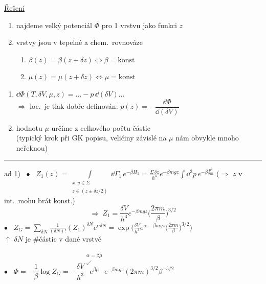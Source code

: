{\color{NavyBlue}
\underline{Řešení}

\begin{minipage}{0.48\textwidth}
\begin{enumerate}[label=\arabic*)]
  \item najdeme velký potenciál $\Phi$ pro 1 vrstvu jako funkci $z$
  \item vrstvy jsou v tepelné a chem.\ rovnováze
  \begin{enumerate}[label=\roman*)]
    \item $\beta(z) = \beta(z + \delta z) \Leftrightarrow \beta = \text{konst}$
    \item $\mu(z) = \mu(z + \delta z) \Leftrightarrow \mu = \text{konst}$
  \end{enumerate}
\end{enumerate}
\end{minipage}
\begin{minipage}{0.5\textwidth}
\end{minipage}

\begin{enumerate}[label=\arabic*),start=3]
  \item $\dd\Phi(T,\delta V,\mu,z) = \dots - p\,\dd(\delta V)\dots$ \\
        $\Rightarrow$ loc.\ je tlak dobře definován: \quad $p(z) = -\dfrac{\dd\Phi}{\dd(\delta V)}$
  \item hodnotu $\mu$ určíme z celkového počtu částic \\
        (typický krok při GK popisu, veličiny závislé na $\mu$ nám obvykle mnoho neřeknou)
\end{enumerate}

\noindent\rule{0.6\linewidth}{0.4pt}

ad 1) \ $\bullet$ \
$Z_1(z) = \displaystyle\int\limits_{\substack{x,y\in\Sigma\\ z\in(z\pm\delta z/2)}}\dd\Gamma_1\,e^{-\beta H_1}
 = \frac{\Sigma\,\delta z}{h^3}e^{-\beta mgz}\int\dd^3p\,e^{-\beta\frac{p^2}{2m}}$
\quad \small($\Rightarrow$ $z$ v int.\ mohu brát konst.)\normalsize
\[
  \Rightarrow\ Z_1 = \frac{\delta V}{h^3}e^{-\beta mgz}\Big(\frac{2\pi m}{\beta}\Big)^{3/2}
\]
$\bullet$ \
$Z_G = \displaystyle\sum_{\delta N}\frac{1}{(\delta N)!}(Z_1)^{\delta N}e^{\alpha\delta N}
 = \exp\Big(\frac{\delta V}{h^3}e^{\alpha - \beta mgz}\Big(\frac{2\pi m}{\beta}\Big)^{3/2}\Big)$ \\
\hspace*{1cm}$\uparrow$ $\delta N$ je \#částic v dané vrstvě

$\bullet$ \
$\Phi = -\dfrac1\beta\log Z_G = -\dfrac{\delta V}{h^3}\overset{\substack{\alpha = \beta\mu\\ \swarrow}}{e^{\beta\mu}}e^{-\beta mgz}(2\pi m)^{3/2}\beta^{-5/2}$
}

